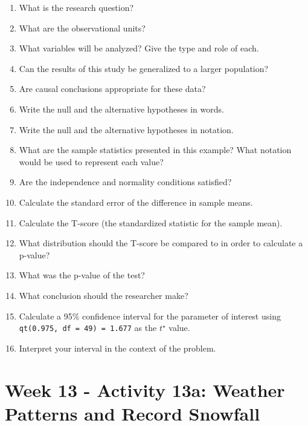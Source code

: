 \documentclass[
]{report}
\newcommand{\rgs}{\vspace{12pt}} %
\begin{document}
\begin{enumerate}
\def\labelenumi{\arabic{enumi}.}
\item
  What is the research question?
  \rgs
\item
  What are the observational units?
  \rgs
\item
  What variables will be analyzed? Give the type and role of each.
  \rgs
  \rgs
\item
  Can the results of this study be generalized to a larger population?
  \rgs
\item
  Are causal conclusions appropriate for these data?
  \rgs
\item
  Write the null and the alternative hypotheses in words.
  \rgs
  \rgs
\item
  Write the null and the alternative hypotheses in notation.
  \rgs
\item
  What are the sample statistics presented in this example? What notation would be used to represent each value?
  \rgs
\item
  Are the independence and normality conditions satisfied?
  \rgs
  \rgs
\item
  Calculate the standard error of the difference in sample means.
  \rgs
  \rgs
\item
  Calculate the T-score (the standardized statistic for the sample mean).
  \rgs
  \rgs
\item
  What distribution should the T-score be compared to in order to calculate a p-value?
  \rgs
\item
  What was the p-value of the test?
  \rgs
\item
  What conclusion should the researcher make?
  \rgs
  \rgs
\item
  Calculate a 95\% confidence interval for the parameter of interest using \texttt{qt(0.975,\ df\ =\ 49)\ =\ 1.677} as the \(t^\star\) value.
  \rgs
  \rgs
\item
  Interpret your interval in the context of the problem.
  \rgs
  \rgs
\end{enumerate}

\newpage

\hypertarget{week-13---activity-13a-weather-patterns-and-record-snowfall}{%
\section{Week 13 - Activity 13a: Weather Patterns and Record Snowfall}\label{week-13---activity-13a-weather-patterns-and-record-snowfall}}
\end{document}

